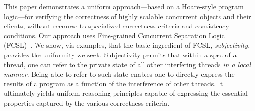 This paper demonstrates a uniform approach---based on a Hoare-style
program logic---for verifying the correctness of highly scalable
concurrent objects and their clients, without recourse to specialized
correctness criteria and consistency conditions. Our approach uses
Fine-grained Concurrent Separation Logic
(FCSL)~\cite{Nanevski-al:ESOP14}. We show, via examples, that the
basic ingredient of FCSL, \emph{subjectivity}, provides the uniformity
we seek. Subjectivity permits that within a spec of a thread, one can
refer to the private state of all other interfering threads \emph{in a
  local manner}. Being able to refer to such state enables one to
directly express the results of a program as a function of the
interference of other threads. It ultimately yields uniform reasoning
principles capable of expressing the essential properties captured by
the various correctness criteria.



